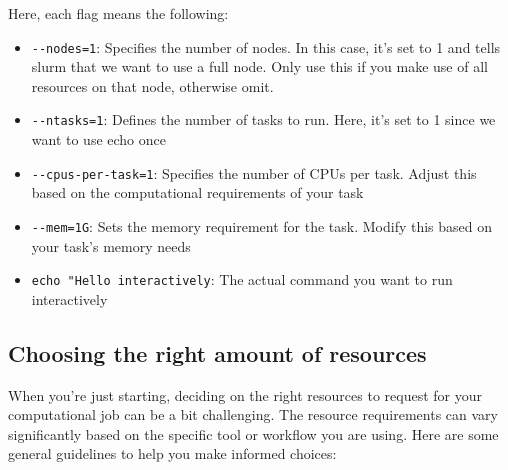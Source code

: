 \documentclass[
  letterpaper,
  DIV=11,
  numbers=noendperiod]{scrreprt}
\providecommand{\tightlist}{%
  \setlength{\itemsep}{0pt}\setlength{\parskip}{0pt}}\usepackage{longtable,booktabs,array}
\begin{document}
Here, each flag means the following:

\begin{itemize}
\tightlist
\item
  \texttt{-\/-nodes=1}: Specifies the number of nodes. In this case,
  it's set to 1 and tells slurm that we want to use a full node. Only
  use this if you make use of all resources on that node, otherwise
  omit.
\item
  \texttt{-\/-ntasks=1}: Defines the number of tasks to run. Here, it's
  set to 1 since we want to use echo once
\item
  \texttt{-\/-cpus-per-task=1}: Specifies the number of CPUs per task.
  Adjust this based on the computational requirements of your task
\item
  \texttt{-\/-mem=1G}: Sets the memory requirement for the task. Modify
  this based on your task's memory needs
\item
  \texttt{echo\ "Hello\ interactively}: The actual command you want to
  run interactively
\end{itemize}

\subsection{Choosing the right amount of
resources}\label{choosing-the-right-amount-of-resources}

When you're just starting, deciding on the right resources to request
for your computational job can be a bit challenging. The resource
requirements can vary significantly based on the specific tool or
workflow you are using. Here are some general guidelines to help you
make informed choices:
\end{document}
